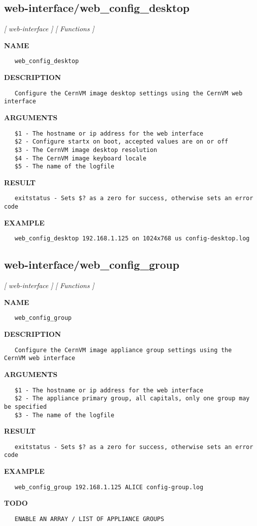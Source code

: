\subsection{web-interface/web\_config\_desktop}
\textsl{[ web-interface ]}
\textsl{[ Functions ]}

\label{ch:robo76}
\label{ch:web_interface_web_config_desktop}
\textbf{NAME}
\begin{verbatim}
   web_config_desktop
\end{verbatim}
\textbf{DESCRIPTION}
\begin{verbatim}
   Configure the CernVM image desktop settings using the CernVM web interface
\end{verbatim}
\textbf{ARGUMENTS}
\begin{verbatim}
   $1 - The hostname or ip address for the web interface
   $2 - Configure startx on boot, accepted values are on or off
   $3 - The CernVM image desktop resolution
   $4 - The CernVM image keyboard locale
   $5 - The name of the logfile
\end{verbatim}
\textbf{RESULT}
\begin{verbatim}
   exitstatus - Sets $? as a zero for success, otherwise sets an error code
\end{verbatim}
\textbf{EXAMPLE}
\begin{verbatim}
   web_config_desktop 192.168.1.125 on 1024x768 us config-desktop.log
\end{verbatim}
\newpage
\subsection{web-interface/web\_config\_group}
\textsl{[ web-interface ]}
\textsl{[ Functions ]}

\label{ch:robo77}
\label{ch:web_interface_web_config_group}
\textbf{NAME}
\begin{verbatim}
   web_config_group
\end{verbatim}
\textbf{DESCRIPTION}
\begin{verbatim}
   Configure the CernVM image appliance group settings using the CernVM web interface
\end{verbatim}
\textbf{ARGUMENTS}
\begin{verbatim}
   $1 - The hostname or ip address for the web interface
   $2 - The appliance primary group, all capitals, only one group may be specified
   $3 - The name of the logfile
\end{verbatim}
\textbf{RESULT}
\begin{verbatim}
   exitstatus - Sets $? as a zero for success, otherwise sets an error code
\end{verbatim}
\textbf{EXAMPLE}
\begin{verbatim}
   web_config_group 192.168.1.125 ALICE config-group.log
\end{verbatim}
\textbf{TODO}
\begin{verbatim}
   ENABLE AN ARRAY / LIST OF APPLIANCE GROUPS
\end{verbatim}
\newpage
